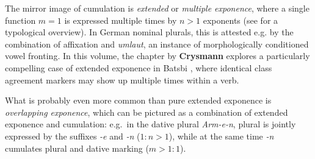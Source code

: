 \documentclass[output=paper]{langscibook}
\begin{document}
\begin{table}
  \caption{German nominal paradigms\label{tab:ParaSplit}}
\end{table}


The mirror image of cumulation is \emph{extended} or \emph{multiple exponence},
where a single function $m=1$ is expressed multiple times by $n>1$
exponents (see \citealp{caballero_g-harris_a12,Harris17} for a typological
overview). In German nominal plurals,
this is attested e.g. by the combination of affixation and
\textit{umlaut}, an instance of morphologically conditioned vowel
fronting. %
In this volume, the chapter by \textbf{Crysmann} explores a particularly
compelling case of extended exponence in Batsbi \citep{Harris09},
where identical class agreement markers may show up multiple times
within a verb. 



What is probably even more common than pure extended exponence is
\emph{overlapping exponence}, which can be pictured as a combination
of extended exponence and cumulation: e.g.\ in the dative plural
\textit{Arm-e-n}, plural is jointly expressed by the suffixes
\textit{-e} and \textit{-n} ($1:n>1$), while at the same time
\textit{-n} cumulates plural and dative marking ($m>1:1$).   
\end{document}
